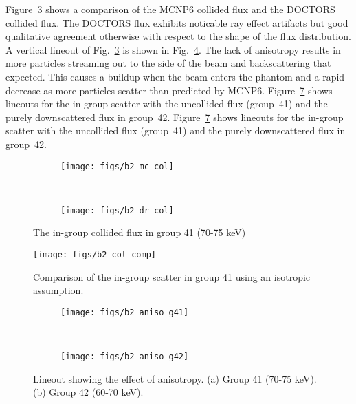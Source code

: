 Figure~\ref{fig:b2_col} shows a comparison of the MCNP6 collided flux and the DOCTORS collided flux. The DOCTORS flux exhibits noticable ray effect artifacts but good qualitative agreement otherwise with respect to the shape of the flux distribution. A vertical lineout of Fig.~\ref{fig:b2_col} is shown in Fig.~\ref{fig:b2_col_comp}. The lack of anisotropy results in more particles streaming out to the side of the beam and backscattering that expected. This causes a buildup when the beam enters the phantom and a rapid decrease as more particles scatter than predicted by MCNP6. Figure~\ref{fig:b2_aniso} shows lineouts for the in-group scatter with the uncollided flux (group~41) and the purely downscattered flux in group~42. Figure~\ref{fig:b2_aniso} shows lineouts for the in-group scatter with the uncollided flux (group~41) and the purely downscattered flux in group~42.

\begin{figure}
    \centering
    \begin{subfigure}[b]{0.45\textwidth}
        \texttt{[image: figs/b2\_mc\_col]}
        \caption{}
        \label{fig:b2_mc_col}
    \end{subfigure}
    ~
    \begin{subfigure}[b]{0.45\textwidth}
        \texttt{[image: figs/b2\_dr\_col]}
        \caption{}
        \label{fig:b2_dr_col}
    \end{subfigure}
    \caption{The in-group collided flux in group 41 (70-75 keV)}\label{fig:b2_col}
\end{figure}

\begin{figure}[tb]
  \begin{center}
   \texttt{[image: figs/b2\_col\_comp]}
  \end{center}
  \caption{Comparison of the in-group scatter in group 41 using an isotropic assumption.}
\label{fig:b2_col_comp}
\end{figure}

\begin{figure}
    \centering
    \begin{subfigure}[b]{0.3\textwidth}
        \texttt{[image: figs/b2\_aniso\_g41]}
        \caption{}
        \label{fig:b2_aniso_g41}
    \end{subfigure}
    ~ 
    \begin{subfigure}[b]{0.3\textwidth}
        \texttt{[image: figs/b2\_aniso\_g42]}
        \caption{}
        \label{fig:b2_aniso_g42}
    \end{subfigure}
    \caption{Lineout showing the effect of anisotropy. (a) Group 41 (70-75 keV). (b) Group 42 (60-70 keV). }\label{fig:b2_aniso}
\end{figure}


